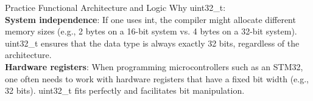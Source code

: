 \documentclass{beamer}
\begin{document}
\begin{frame}{Practice}
	{Functional Architecture and Logic}
	Why uint32\_t:\\
	\textbf{System independence}: If one uses int, the compiler might allocate different memory sizes (e.g., 2 bytes on a 16-bit system vs. 4 bytes on a 32-bit system). uint32\_t ensures that the data type is always exactly 32 bits, regardless of the architecture.\\
	\vspace{0.2cm}
	\textbf{Hardware registers}: When programming microcontrollers such as an STM32, one often needs to work with hardware registers that have a fixed bit width (e.g., 32 bits). uint32\_t fits perfectly and facilitates bit manipulation.\\
\end{frame}
\end{document}
